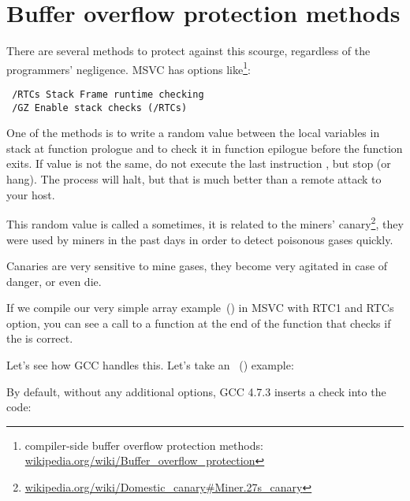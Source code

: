 \section{Buffer overflow protection methods}
\label{subsec:BO_protection}

There are several methods to protect against this scourge, regardless of the \CCpp programmers' negligence.
MSVC has options like\footnote{compiler-side buffer overflow protection methods:
\href{http://go.yurichev.com/17133}{wikipedia.org/wiki/Buffer\_overflow\_protection}}:

\begin{lstlisting}
 /RTCs Stack Frame runtime checking
 /GZ Enable stack checks (/RTCs)
\end{lstlisting}


One of the methods is to write a random value between the local variables in stack at function prologue 
and to check it in function epilogue before the function exits.
If value is not the same, do not execute the last instruction \RET, but stop (or hang).
The process will halt, but that is much better than a remote attack to your host.
    
\newcommand{\CANARYURL}{\href{http://go.yurichev.com/17134}{wikipedia.org/wiki/Domestic\_canary\#Miner.27s\_canary}}


This random value is called a  sometimes, it is related to the miners' canary\footnote{\CANARYURL},
they were used by miners in the past days in order to detect poisonous gases quickly.

Canaries are very sensitive to mine gases, they become very agitated in case of danger, or even die.

If we compile our very simple array example~() in \ac{MSVC}
with RTC1 and RTCs option, you can see a call to
 a function at the end of the function that checks if the  is correct.

Let's see how GCC handles this. 
Let's take an ~() example:



By default, without any additional options, GCC 4.7.3 inserts a  check into the code:



